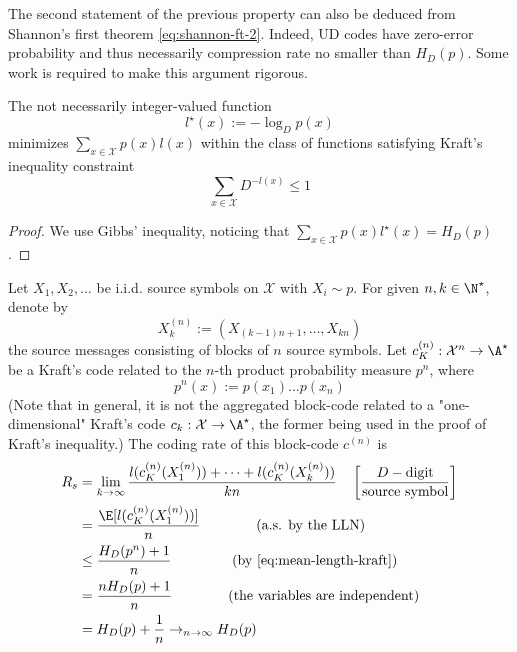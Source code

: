\documentclass{../cs-classes/cs-classes}
\newcommand*{\X}{\mathcal{X}}
\begin{document}
\begin{remark}
    The second statement of the previous property can also be deduced from Shannon's first theorem \eqref{eq:shannon-ft-2}. Indeed, UD codes have zero-error probability and thus necessarily compression rate no smaller than $H_D(p)$. Some work is required to make this argument rigorous.
\end{remark}

\begin{property}
    The not necessarily integer-valued function
    \begin{equation*}
        l^\star(x):=-\log_Dp(x)
    \end{equation*}
    minimizes $\sum_{x\in\X}p(x)l(x)$ within the class of functions satisfying Kraft's inequality constraint
    \begin{equation*}
        \sum_{x\in\X}D^{-l(x)}\leq 1
    \end{equation*}
\end{property}

\begin{proof}
    We use Gibbs' inequality, noticing that $\sum_{x\in\X}p(x)l^\star(x)=H_D(p)$.
\end{proof}

\begin{corollary}
    Let $X_1, X_2, \dots$ be i.i.d. source symbols on $\X$ with $X_i\sim p$. For given $n, k\in\N^\star$, denote by
    \begin{equation*}
        X_k^{(n)} := (X_{(k-1)n+1}, \dots, X_{kn})
    \end{equation*}
    the source messages consisting of blocks of $n$ source symbols. Let $c_K^{(n)}:\X^n \to \A^\star$ be a Kraft's code related to the $n$-th product probability measure $p^n$, where 
    \begin{equation*}
        p^n(x):=p(x_1)\dots p(x_n)
    \end{equation*}
    (Note that in general, it is not the aggregated block-code related to a "one-dimensional" Kraft's code $c_k:\X\to\A^\star$, the former being used in the proof of Kraft's inequality.) The coding rate of this block-code $c^{(n)}$ is
    \begin{equation*}
        \begin{aligned}
            R_s &= \lim_{k\to\infty} \frac{l(c_K^{(n)}(X_1^{(n)}))+\dots+l(c_K^{(n)}(X_k^{(n)}))}{kn} \quad \left[\frac{D-\textnormal{digit}}{\textnormal{source symbol}}\right]\\
            &= \frac{\E[l(c_K^{(n)}(X_1^{(n)}))]}{n} \qquad\qquad \textnormal{(a.s. by the LLN)}\\
            &\leq \frac{H_D(p^n)+1}{n} \qquad\qquad \textnormal{(by \eqref{eq:mean-length-kraft})}\\
            &= \frac{nH_D(p)+1}{n} \qquad\qquad \textnormal{(the variables are independent)}\\
            &=H_D(p)+\frac{1}{n} \to_{n\to\infty} H_D(p)
        \end{aligned}
    \end{equation*}
\end{corollary}
\end{document}

